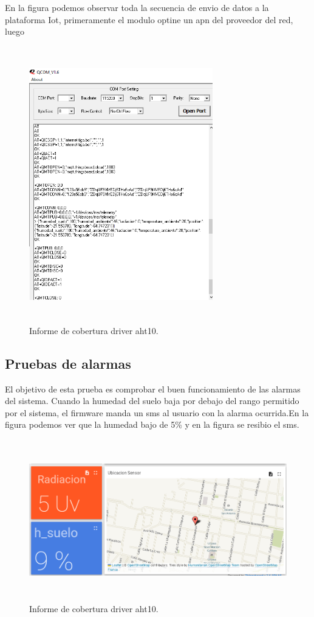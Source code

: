 En la figura podemos observar toda la secuencia de envio de datos a la plataforma Iot, primeramente el modulo optine un apn del proveedor del red, luego

\begin{figure}[h]
  \centering
    \includegraphics[width=8cm, height=12cm]{./Figures/Qcom_enviodedatos.png}
  \caption{Informe de cobertura driver aht10.}
    \label{fig:conexion broker}
\end{figure}

\subsection{Pruebas de alarmas}
El objetivo de esta prueba es comprobar el buen funcionamiento de las alarmas del sistema.
Cuando la humedad del suelo baja por debajo del rango permitido por el sistema, el firmware manda un sms al usuario con la alarma ocurrida.En la figura podemos ver que la humedad bajo de 5\% y en la figura se resibio el sms.

\begin{figure}[h!]
  \centering
    \includegraphics[width=\linewidth, height=7cm]{./Figures/humedad_menor2.png}
  \caption{Informe de cobertura driver aht10.}
    \label{fig:humedad menor}
\end{figure}

